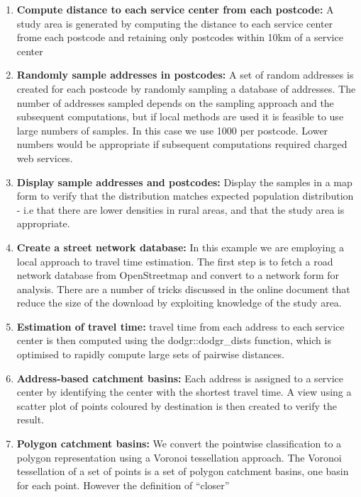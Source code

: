 \documentclass[utf8]{frontiersHLTH}
\begin{document}
\begin{table}[h]
\begin{center}
  \sffamily
  \tiny
\begin{enumerate}
  \def\labelenumi{\arabic{enumi}.}
  \setcounter{enumi}{3}
\item
  {\bf Compute distance to each service center from each postcode:} A study
  area is generated by computing the distance to each service center
  frome each postcode and retaining only postcodes within 10km of a
  service center
\item
 {\bf Randomly sample addresses in postcodes:} A set of random addresses is created for each
  postcode by randomly sampling a database of addresses. The number of
  addresses sampled depends on the sampling approach and the subsequent
  computations, but if local methods are used it is feasible to use
  large numbers of samples. In this case we use 1000 per postcode. Lower
  numbers would be appropriate if subsequent computations required
  charged web services.
\item
  {\bf Display sample addresses and postcodes:} Display the samples in a map
  form to verify that the distribution matches expected population
  distribution - i.e that there are lower densities in rural areas, and
  that the study area is appropriate.
\item
  {\bf Create a street network database:} In this example we are employing a
  local approach to travel time estimation. The first step is to fetch a
  road network database from OpenStreetmap and convert to a network form
  for analysis. There are a number of tricks discussed in the online
  document that reduce the size of the download by exploiting knowledge
  of the study area.
\item
  {\bf Estimation of travel time:} travel time from each address to each
  service center is then computed using the dodgr::dodgr\_dists
  function, which is optimised to rapidly compute large sets of pairwise
  distances.
\item
  {\bf Address-based catchment basins:} Each address is assigned to a service
  center by identifying the center with the shortest travel time. A view
  using a scatter plot of points coloured by destination is then created
  to verify the result.
\item
  {\bf Polygon catchment basins:} We convert the pointwise classification to a
  polygon representation using a Voronoi tessellation approach. The
  Voronoi tessellation of a set of points is a set of polygon catchment
  basins, one basin for each point. However the definition of ``closer''

\end{enumerate}
\end{center}
\end{table}
\end{document}
